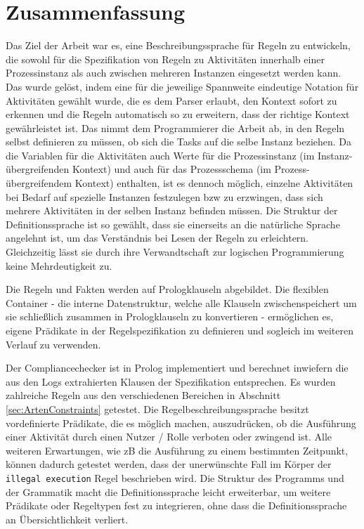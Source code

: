 
\chapter{Zusammenfassung} %

\label{Kapitel6} %


Das Ziel der Arbeit war es, eine Beschreibungssprache für Regeln zu entwickeln, die sowohl für die Spezifikation von Regeln zu Aktivitäten innerhalb einer Prozessinstanz als auch zwischen mehreren Instanzen eingesetzt werden kann. Das wurde gelöst, indem eine für die jeweilige Spannweite eindeutige Notation für Aktivitäten gewählt wurde, die es dem Parser erlaubt, den Kontext sofort zu erkennen und die Regeln automatisch so zu erweitern, dass der richtige Kontext gewährleistet ist. Das nimmt dem Programmierer die Arbeit ab, in den Regeln selbst definieren zu müssen, ob sich die Tasks auf die selbe Instanz beziehen. Da die Variablen für die Aktivitäten auch Werte für die Prozessinstanz (im Instanz-übergreifenden Kontext) und auch für das Prozessschema (im Prozess-übergreifendem Kontext) enthalten, ist es dennoch möglich, einzelne Aktivitäten bei Bedarf auf spezielle Instanzen festzulegen bzw zu erzwingen, dass sich mehrere Aktivitäten in der selben Instanz befinden müssen. Die Struktur der Definitionssprache ist so gewählt, dass sie einerseits an die natürliche Sprache angelehnt ist, um das Verständnis bei Lesen der Regeln zu erleichtern. Gleichzeitig lässt sie durch ihre Verwandtschaft zur logischen Programmierung keine Mehrdeutigkeit zu.

Die Regeln und Fakten werden auf Prologklauseln abgebildet. Die flexiblen Container - die interne Datenstruktur, welche alle Klauseln zwischenspeichert um sie schließlich zusammen in Prologklauseln zu konvertieren - ermöglichen es, eigene Prädikate in der Regelspezifikation zu definieren und sogleich im weiteren Verlauf zu verwenden. 

Der Compliancechecker ist in Prolog implementiert und berechnet inwiefern die aus den Logs extrahierten Klausen der Spezifikation entsprechen. Es wurden zahlreiche Regeln aus den verschiedenen Bereichen in Abschnitt \ref{sec:ArtenConstraints} getestet. Die Regelbeschreibungssprache besitzt vordefinierte Prädikate, die es möglich machen, auszudrücken, ob die Ausführung einer Aktivität durch einen Nutzer / Rolle verboten oder zwingend ist. Alle weiteren Erwartungen, wie zB die Ausführung zu einem bestimmten Zeitpunkt, können dadurch getestet werden, dass der unerwünschte Fall im Körper der \texttt{illegal execution} Regel beschrieben wird.
Die Struktur des Programms und der Grammatik macht die Definitionssprache leicht erweiterbar, um weitere Prädikate oder Regeltypen fest zu integrieren, ohne dass die Definitionssprache an Übersichtlichkeit verliert.





